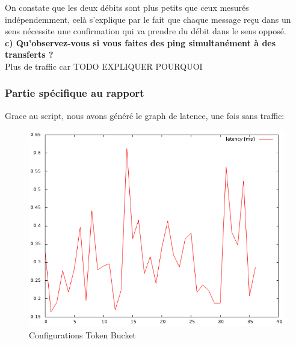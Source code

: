 \documentclass{article}
\begin{document}
On constate que les deux débits sont plus petits que ceux mesurés indépendemment, celà s'explique par le fait que chaque message reçu dans un sens nécessite une confirmation qui va prendre du débit dans le sens opposé.
\\

\textbf{c) Qu'observez-vous si vous faites des ping simultanément à des transferts ?}\\
Plus de traffic car TODO EXPLIQUER POURQUOI

\subsubsection{Partie spécifique au rapport}
Grace au script, nous avons généré le graph de latence, une fois sans traffic:
\begin{figure}[h]
  \centering
  \includegraphics[width=\linewidth]{./captures/6-plot.png}
  \caption{Configurations Token Bucket}
  \label{fig:token-bucket}
\end{figure}
\end{document}
